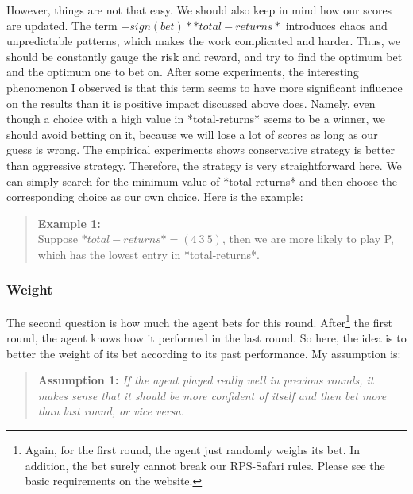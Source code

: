 \documentclass[10pt]{article}
\begin{document}
However, things are not that easy. We should also keep in mind how our scores are updated. The term $- sign(bet)* *total-returns*$ introduces chaos and unpredictable patterns, which makes the work complicated and harder. Thus, we should be constantly gauge the risk and reward, and try to find the optimum bet and the optimum one to bet on. After some experiments, the interesting phenomenon I observed is that this term seems to have more significant influence on the results than it is positive impact discussed above does. Namely, even though a choice with a high value in *total-returns* seems to be a winner, we should avoid betting on it, because we will lose a lot of scores as long as our guess is wrong. The empirical experiments shows conservative strategy is better than aggressive strategy. Therefore, the strategy is very straightforward here. We can simply search for the minimum value of *total-returns* and then choose the corresponding choice as our own choice. Here is the example:
\begin{quote}
\textbf{Example 1:}\\
Suppose $*total-returns*=(4\ 3\ 5)$, then we are more likely to play P, which has the lowest entry in *total-returns*.
\end{quote}


\subsubsection{Weight}
The second question is how much the agent bets for this round. After\footnote{Again, for the first round, the agent just randomly weighs its bet. In addition, the bet surely cannot break  our RPS-Safari rules. Please see the basic requirements on the website.} the first round, the agent knows how it performed in the last round. So here, the idea is to better the weight of its bet according to its past performance. My assumption is:
\begin{quote}
\textbf{Assumption 1:} \textit{If the agent played really well in previous rounds, it makes sense that it should be more confident of itself and then bet more than last round, or vice versa.}
\end{quote}
\end{document}
